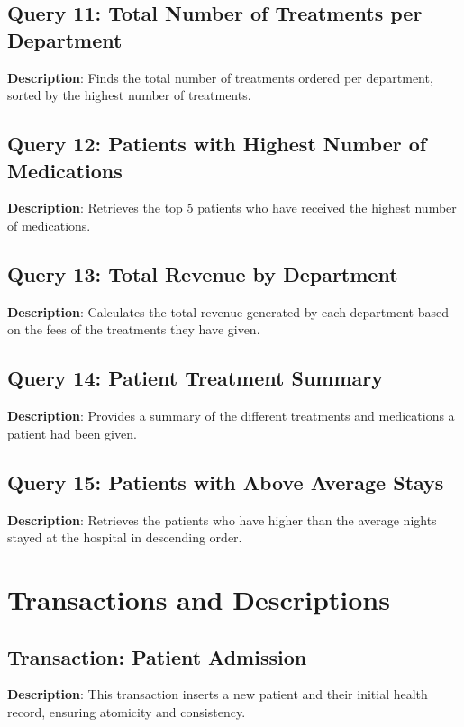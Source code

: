\documentclass[a4paper,11pt]{article}
\theoremstyle{mytheor}
\begin{document}
\subsection{Query 11: Total Number of Treatments per Department}

\textbf{Description}: Finds the total number of treatments ordered per department, sorted by the highest number of treatments.

\subsection{Query 12: Patients with Highest Number of Medications}

\textbf{Description}: Retrieves the top 5 patients who have received the highest number of medications.

\subsection{Query 13: Total Revenue by Department}

\textbf{Description}: Calculates the total revenue generated by each department based on the fees of the treatments they have given.

\subsection{Query 14: Patient Treatment Summary}

\textbf{Description}: Provides a summary of the different treatments and medications a patient had been given.

\subsection{Query 15: Patients with Above Average Stays}

\textbf{Description}: Retrieves the patients who have higher than the average nights stayed at the hospital in descending order.

\section{Transactions and Descriptions}
\subsection{Transaction: Patient Admission}

\textbf{Description}: This transaction inserts a new patient and their initial health record, ensuring atomicity and consistency.
\end{document}
